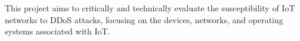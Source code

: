 This project aims to critically and technically evaluate the susceptibility of
IoT networks to DDoS attacks, focusing on the devices, networks, and operating
systems associated with IoT.
